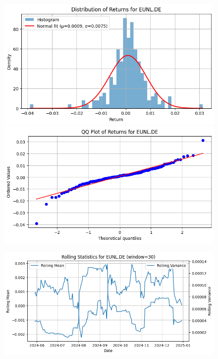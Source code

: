 \documentclass{article}%
\begin{document}
%


\begin{figure}[htbp]%
\begin{minipage}{0.49\textwidth}%
\includegraphics[width=\linewidth]{ticker_images/EUNL.DE_return_distribution.png}%
\end{minipage}%
\begin{minipage}{0.49\textwidth}%
\includegraphics[width=\linewidth]{ticker_images/EUNL.DE_qq_plot.png}%
\end{minipage}%
\end{figure}

%


\begin{figure}[htbp]%
\begin{minipage}{0.49\textwidth}%
\includegraphics[width=\linewidth]{ticker_images/EUNL.DE_rolling_stats.png}%
\end{minipage}%
\end{figure}
\end{document}
